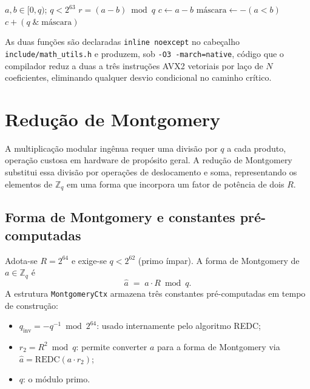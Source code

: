 \documentclass[11pt,a4paper]{report}
\begin{document}
\begin{algorithm}[ht]
\caption{\texttt{mod\_sub}: subtração modular sem desvio condicional}
\label{alg:mod_sub}
\begin{algorithmic}[1]
\Require $a, b \in [0, q)$;\; $q < 2^{63}$
\Ensure $r = (a - b) \bmod q$
\State $c \gets a - b$
  \Comment{Enrola para $[2^{64}-q,\, 2^{64})$ se $a < b$}
\State $\text{máscara} \gets -(a < b)$
\State \Return $c + (q \;\mathbin{\&}\; \text{máscara})$
\end{algorithmic}
\end{algorithm}

As duas funções são declaradas \texttt{inline noexcept} no cabeçalho
\texttt{include/math\_utils.h} e produzem, sob \texttt{-O3 -march=native}, código
que o compilador reduz a duas a três instruções AVX2 vetoriais por laço de $N$
coeficientes, eliminando qualquer desvio condicional no caminho crítico.

\chapter{Redução de Montgomery}
\label{cap:montgomery}

A multiplicação modular ingênua requer uma divisão por $q$ a cada produto, operação
custosa em hardware de propósito geral. A redução de Montgomery~\cite{Montgomery1985}
substitui essa divisão por operações de deslocamento e soma, representando os
elementos de $\mathbb{Z}_q$ em uma forma que incorpora um fator de potência de dois $R$.

\section{Forma de Montgomery e constantes pré-computadas}
\label{sec:mont_constants}

Adota-se $R = 2^{64}$ e exige-se $q < 2^{62}$ (primo ímpar). A forma de Montgomery de
$a \in \mathbb{Z}_q$ é
\begin{equation}
  \hat{a} \;=\; a \cdot R \bmod q.
  \label{eq:mont_form}
\end{equation}
A estrutura \texttt{MontgomeryCtx} armazena três constantes pré-computadas em
tempo de construção:
\begin{itemize}
  \item $q_{\text{inv}} = -q^{-1} \bmod 2^{64}$: usado internamente pelo algoritmo REDC;
  \item $r_2 = R^2 \bmod q$: permite converter $a$ para a forma de Montgomery via
    $\hat{a} = \text{REDC}(a \cdot r_2)$;
  \item $q$: o módulo primo.
\end{itemize}
\end{document}
